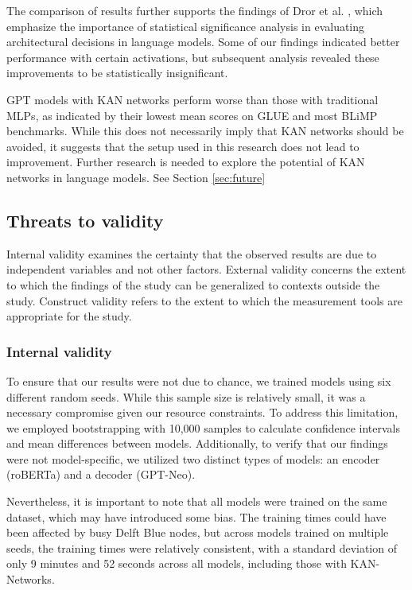 The comparison of results further supports the findings of Dror et al. \cite{dror2018hitchhikers}, which emphasize the importance of statistical significance analysis in evaluating architectural decisions in language models. Some of our findings indicated better performance with certain activations, but subsequent analysis revealed these improvements to be statistically insignificant.

GPT models with KAN networks perform worse than those with traditional MLPs, as indicated by their lowest mean scores on GLUE and most BLiMP benchmarks. While this does not necessarily imply that KAN networks should be avoided, it suggests that the setup used in this research does not lead to improvement. Further research is needed to explore the potential of KAN networks in language models. See Section \ref{sec:future}

\subsection{Threats to validity}
Internal validity examines the certainty that the observed results are due to independent variables and not other factors. External validity concerns the extent to which the findings of the study can be generalized to contexts outside the study. Construct validity refers to the extent to which the measurement tools are appropriate for the study. 

\subsubsection{Internal validity}
\label{sec:internal}
To ensure that our results were not due to chance, we trained models using six different random seeds. While this sample size is relatively small, it was a necessary compromise given our resource constraints. To address this limitation, we employed bootstrapping with 10,000 samples to calculate confidence intervals and mean differences between models. Additionally, to verify that our findings were not model-specific, we utilized two distinct types of models: an encoder (roBERTa) and a decoder (GPT-Neo).

Nevertheless, it is important to note that all models were trained on the same dataset, which may have introduced some bias. The training times could have been affected by busy Delft Blue nodes, but across models trained on multiple seeds, the training times were relatively consistent, with a standard deviation of only 9 minutes and 52 seconds across all models, including those with KAN-Networks.

